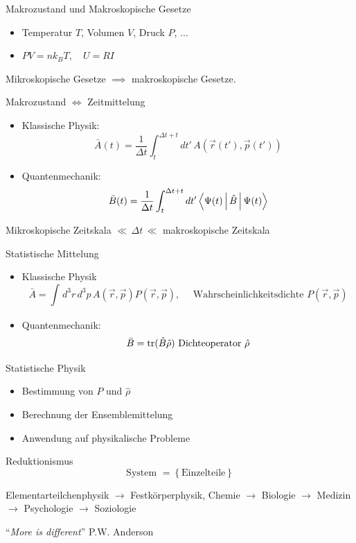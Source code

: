 \begin{description}
  \item Makrozustand und Makroskopische Gesetze
    \begin{itemize}
      \item Temperatur $T$, Volumen $V$, Druck $P$, ...
      \item $P V=nk_BT, \quad U=RI$
    \end{itemize}
  \item Mikroskopische Gesetze $\implies $ makroskopische Gesetze.
  \item Makrozustand $\iff $ Zeitmittelung
    \begin{itemize}
      \item Klassische Physik: \[ \bar{A}(t)= \frac{1}{\Delta t} \int_{t}^{\Delta t +t}
        dt'\, A(\vec{r}(t'),\vec{p}(t'))\] 
      \item Quantenmechanik: \[ \bar{B}(t) = \frac{1}{\Delta t} \int_{t}^{\Delta t+t}
        dt' \Braket{\Psi(t) | \hat{B} | \Psi (t)}\] 
    \end{itemize}
  \item Mikroskopische Zeitskala $\ll\, \Delta t \, \ll$ makroskopische Zeitskala
  \item Statistische Mittelung
    \begin{itemize}
      \item Klassische Physik \[ \bar{A} = \int_{}^{} d^3r\, d^3p\,
        A(\vec{r}, \vec{p}) P(\vec{r}, \vec{p}), \quad
        \text{ Wahrscheinlichkeitsdichte } P(\vec{r}, \vec{p}) \] 
      \item Quantenmechanik: \[ \bar{B}= \operatorname{tr}(\hat{B} \hat{\rho})
          \text{ Dichteoperator } \hat{\rho} \]   
    \end{itemize}
  \item Statistische Physik
    \begin{itemize}
      \item Bestimmung von $P$ und $\hat{\rho}$
      \item Berechnung der Ensemblemittelung
      \item Anwendung auf physikalische Probleme
    \end{itemize}
  \item Reduktionismus \[ \text{System } = \left\{ \text{Einzelteile} \right\} \] 
  \item Elementarteilchenphysik $\to $ Festk\"orperphysik, Chemie $\to $
    Biologie $\to $ Medizin $\to $ Psychologie $\to $ Soziologie
  \item ``\emph{More is different}'' P.W. Anderson
    
\end{description}
